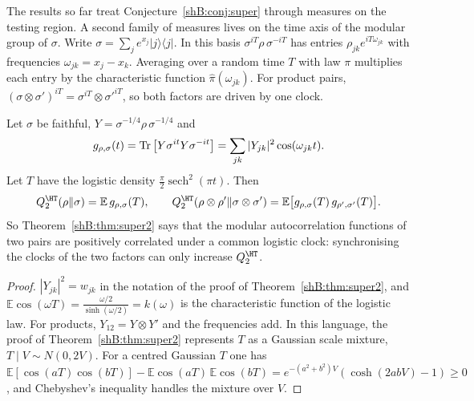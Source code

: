 The results so far treat Conjecture~\ref{shB:conj:super} through measures on the testing region. A second family of measures lives on the time axis of the modular group of $\sigma$. Write $\sigma=\sum_je^{x_j}|j\rangle\langle j|$. In this basis $\sigma^{iT}\rho\,\sigma^{-iT}$ has entries $\rho_{jk}e^{iT\omega_{jk}}$ with frequencies $\omega_{jk}=x_j-x_k$. Averaging over a random time $T$ with law $\pi$ multiplies each entry by the characteristic function $\hat\pi(\omega_{jk})$. For product pairs, $(\sigma\otimes\sigma')^{iT}=\sigma^{iT}\otimes\sigma'^{iT}$, so both factors are driven by one clock.

\begin{proposition}\label{shB:prop:clock}
Let $\sigma$ be faithful, $Y=\sigma^{-1/4}\rho\,\sigma^{-1/4}$ and
\[
g_{\rho,\sigma}(t)=\operatorname{Tr}\big[Y\sigma^{it}Y\sigma^{-it}\big]=\sum_{jk}|Y_{jk}|^2\cos(\omega_{jk}t).
\] Let $T$ have the logistic density $\frac\pi2\operatorname{sech}^2(\pi t)$. Then
\[
Q^\HT_2(\rho\|\sigma)=\mathbb E\,g_{\rho,\sigma}(T),\qquad Q^\HT_2(\rho\otimes\rho'\|\sigma\otimes\sigma')=\mathbb E\big[g_{\rho,\sigma}(T)\,g_{\rho',\sigma'}(T)\big].
\]
So Theorem~\ref{shB:thm:super2} says that the modular autocorrelation functions of two pairs are positively correlated under a common logistic clock: synchronising the clocks of the two factors can only increase $Q^\HT_2$.
\end{proposition}

\begin{proof}
$|Y_{jk}|^2=w_{jk}$ in the notation of the proof of Theorem~\ref{shB:thm:super2}, and $\mathbb E\cos(\omega T)=\frac{\omega/2}{\sinh(\omega/2)}=k(\omega)$ is the characteristic function of the logistic law. For products, $Y_{12}=Y\otimes Y'$ and the frequencies add. In this language, the proof of Theorem~\ref{shB:thm:super2} represents $T$ as a Gaussian scale mixture, $T\mid V\sim N(0,2V)$. For a centred Gaussian $T$ one has $\mathbb E[\cos(aT)\cos(bT)]-\mathbb E\cos(aT)\,\mathbb E\cos(bT)=e^{-(a^2+b^2)V}(\cosh(2abV)-1)\ge0$, and Chebyshev's inequality handles the mixture over $V$.
\end{proof}

